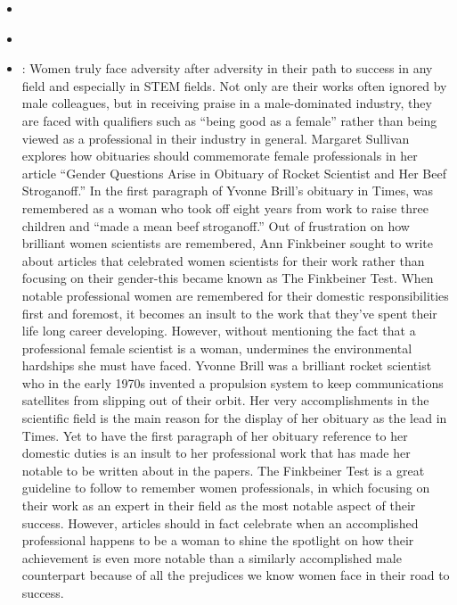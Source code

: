 \documentclass[12pt,a4paper]{article}
\begin{document}
\begin{enumerate}
\begin{itemize}
      \item {} \href{https://www.youtube.com/watch?v=QgUVrzkQgds&feature=youtu.be}{}
      \item \href{https://www.theguardian.com/science/sifting-the-evidence/2015/oct/13/why-ada-lovelace-day-matters}{}
      \item \href{https://web.archive.org/web/20170312212947/http:/www.doublexscience.org/the-finkbeiner-test/}{} \imp{\&} \href{https://publiceditor.blogs.nytimes.com/2013/04/01/gender-questions-arise-in-obituary-of-rocket-scientist-and-her-beef-stroganoff/}{}: Women truly face adversity after adversity in their path to success in any field and especially in STEM fields. Not only are their works often ignored by male colleagues, but in receiving praise in a male-dominated industry, they are faced with qualifiers such as ``being good as a female'' rather than being viewed as a professional in their industry in general. Margaret Sullivan explores how obituaries should commemorate female professionals in her article ``Gender Questions Arise in Obituary of Rocket Scientist and Her Beef Stroganoff.'' In the first paragraph of Yvonne Brill’s obituary in Times, was remembered as a woman who took off eight years from work to raise three children and ``made a mean beef stroganoff.'' Out of frustration on how brilliant women scientists are remembered, Ann Finkbeiner sought to write about articles that celebrated women scientists for their work rather than focusing on their gender-this became known as The Finkbeiner Test. When notable professional women are remembered for their domestic responsibilities first and foremost, it becomes an insult to the work that they’ve spent their life long career developing. However, without mentioning the fact that a professional female scientist is a woman, undermines the environmental hardships she must have faced. Yvonne Brill was a brilliant rocket scientist who in the early 1970s invented a propulsion system to keep communications satellites from slipping out of their orbit. Her very accomplishments in the scientific field is the main reason for the display of her obituary as the lead in Times. Yet to have the first paragraph of her obituary reference to her domestic duties is an insult to her professional work that has made her notable to be written about in the papers. The Finkbeiner Test is a great guideline to follow to remember women professionals, in which focusing on their work as an expert in their field as the most notable aspect of their success. However, articles should in fact celebrate when an accomplished professional happens to be a woman to shine the spotlight on how their achievement is even more notable than a similarly accomplished male counterpart because of all the prejudices we know women face in their road to success.

\end{itemize}
\end{enumerate}
\end{document}
